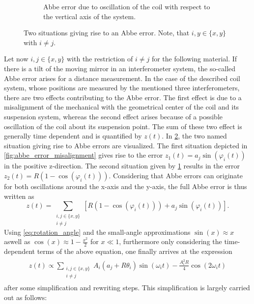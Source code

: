\documentclass{report}
\numberwithin{tm}{section}
\begin{document}
\begin{figure}[h]
\begin{subfigure}{0.49\textwidth}
		\caption{Abbe error due to oscillation of the coil with respect to the vertical axis of the system.}
		\label{fig:abbe_error_tilt}
	\end{subfigure}
	\caption{Two situations giving rise to an Abbe error. Note, that $i,y \in \{x,y\}$ with $i \neq j$.}
	\label{fig:abbe_error_situations}
\end{figure}

Let now $i, j \in \{x,y\}$ with the restriction of $i\neq j$ for the following material. If there is a tilt of the moving mirror in an interferometer system, the so-called Abbe error arises for a distance measurement. In the case of the described coil system, whose positions are measured by the mentioned three interferometers, there are two effects contributing to the Abbe error. The first effect is due to a misalignment of the mechanical with the geometrical center of the coil and its suspension system, whereas the second effect arises because of a possible oscillation of the coil about its suspension point. The sum of these two effect is generally time dependent and is quantified by $z(t)$. In \cref{fig:abbe_error_situations}, the two named situation giving rise to Abbe errors are visualized. The first situation depicted in \cref{fig:abbe_error_misalignment} gives rise to the error $z_1(t) = a_j\sin(\varphi_i(t))$ in the positive z-direction. The second situation given by \cref{fig:abbe_error_tilt} results in the error $z_2(t) = R(1-\cos(\varphi_i(t)))$. Considering that Abbe errors can originate for both oscillations around the x-axis and the y-axis, the full Abbe error is thus written as \begin{equation}
	z(t) = \sum_{\substack{i,j \in \{x,y\} \\ i \neq j} }\left[R(1-\cos(\varphi_i(t))) + a_j\sin(\varphi_i(t))\right].
\end{equation} Using \cref{eq:rotation_angle} and the small-angle approximations $\sin(x)\approx x$ aswell as $\cos(x) \approx 1- \frac{x^2}{2}$ for $x \ll 1$, furthermore only considering the time-dependent terms of the above equation, one finally arrives at the expression \begin{align}\begin{aligned}
		z(t) \propto \sum_{\substack{i,j \in \{x,y\} \\ i \neq j} }A_i(a_j + R\theta_i)\sin(\omega_i t) - \frac{A_i^2 R}{4}\cos(2\omega_i t)
\end{aligned}\end{align} after some simplification and rewriting steps. This simplification is largely carried out as follows:
\end{document}
